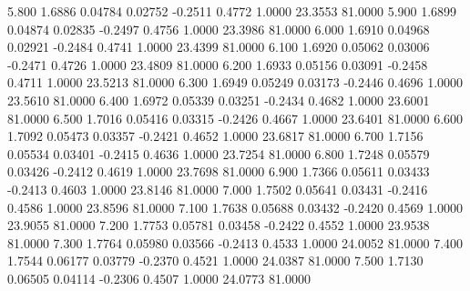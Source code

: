    5.800   1.6886   0.04784   0.02752  -0.2511   0.4772   1.0000  23.3553  81.0000
   5.900   1.6899   0.04874   0.02835  -0.2497   0.4756   1.0000  23.3986  81.0000
   6.000   1.6910   0.04968   0.02921  -0.2484   0.4741   1.0000  23.4399  81.0000
   6.100   1.6920   0.05062   0.03006  -0.2471   0.4726   1.0000  23.4809  81.0000
   6.200   1.6933   0.05156   0.03091  -0.2458   0.4711   1.0000  23.5213  81.0000
   6.300   1.6949   0.05249   0.03173  -0.2446   0.4696   1.0000  23.5610  81.0000
   6.400   1.6972   0.05339   0.03251  -0.2434   0.4682   1.0000  23.6001  81.0000
   6.500   1.7016   0.05416   0.03315  -0.2426   0.4667   1.0000  23.6401  81.0000
   6.600   1.7092   0.05473   0.03357  -0.2421   0.4652   1.0000  23.6817  81.0000
   6.700   1.7156   0.05534   0.03401  -0.2415   0.4636   1.0000  23.7254  81.0000
   6.800   1.7248   0.05579   0.03426  -0.2412   0.4619   1.0000  23.7698  81.0000
   6.900   1.7366   0.05611   0.03433  -0.2413   0.4603   1.0000  23.8146  81.0000
   7.000   1.7502   0.05641   0.03431  -0.2416   0.4586   1.0000  23.8596  81.0000
   7.100   1.7638   0.05688   0.03432  -0.2420   0.4569   1.0000  23.9055  81.0000
   7.200   1.7753   0.05781   0.03458  -0.2422   0.4552   1.0000  23.9538  81.0000
   7.300   1.7764   0.05980   0.03566  -0.2413   0.4533   1.0000  24.0052  81.0000
   7.400   1.7544   0.06177   0.03779  -0.2370   0.4521   1.0000  24.0387  81.0000
   7.500   1.7130   0.06505   0.04114  -0.2306   0.4507   1.0000  24.0773  81.0000
